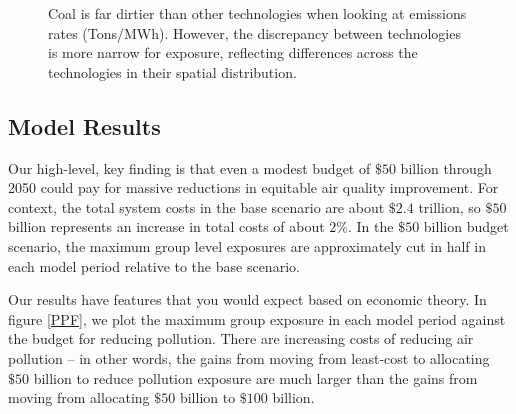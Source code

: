 \documentclass[a4paper]{article}
\theoremstyle{definition}
\theoremstyle{plain}
\begin{document}
\begin{figure}
\centering
{}%
\hfill
{}%
\hfill
\caption{Coal is far dirtier than other technologies when looking at emissions rates (Tons/MWh).  However, the discrepancy between technologies is more narrow for exposure, reflecting differences across the technologies in their spatial distribution.}
\label{EmissionsExposureCoefs}
\end{figure}

\subsection{Model Results}
Our high-level, key finding is that even a modest budget of $\$50$ billion through 2050 could pay for massive reductions in equitable air quality improvement. For context, the total system costs in the base scenario are about $\$2.4$ trillion, so $\$50$ billion represents an increase in total costs of about 2$\%$. In the $\$50$ billion budget scenario, the maximum group level exposures are approximately cut in half in each model period relative to the base scenario. 

Our results have features that you would expect based on economic theory. In figure \ref{PPF}, we plot the maximum group exposure in each model period against the budget for reducing pollution. There are increasing costs of reducing air pollution -- in other words, the gains from moving from least-cost to allocating $\$50$ billion to reduce pollution exposure are much larger than the gains from moving from allocating $\$50$ billion to $\$100$ billion.
\end{document}
